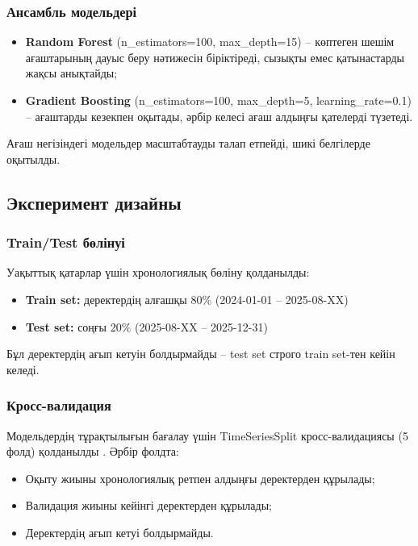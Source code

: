 \documentclass[12pt,a4paper]{article}
\begin{document}
\subsubsection{Ансамбль модельдері}

\begin{itemize}
\item \textbf{Random Forest} (n\_estimators=100, max\_depth=15) – көптеген шешім ағаштарының дауыс беру нәтижесін біріктіреді, сызықты емес қатынастарды жақсы анықтайды;
\item \textbf{Gradient Boosting} (n\_estimators=100, max\_depth=5, learning\_rate=0.1) – ағаштарды кезекпен оқытады, әрбір келесі ағаш алдыңғы қателерді түзетеді.
\end{itemize}

Ағаш негізіндегі модельдер масштабтауды талап етпейді, шикі белгілерде оқытылды.

\subsection{Эксперимент дизайны}

\subsubsection{Train/Test бөлінуі}

Уақыттық қатарлар үшін хронологиялық бөліну қолданылды:
\begin{itemize}
\item \textbf{Train set:} деректердің алғашқы 80\% (2024-01-01 – 2025-08-XX)
\item \textbf{Test set:} соңғы 20\% (2025-08-XX – 2025-12-31)
\end{itemize}

Бұл деректердің ағып кетуін болдырмайды – test set строго train set-тен кейін келеді.

\subsubsection{Кросс-валидация}

Модельдердің тұрақтылығын бағалау үшін TimeSeriesSplit кросс-валидациясы (5 фолд) қолданылды \cite{bergmeir2012}. Әрбір фолдта:
\begin{itemize}
\item Оқыту жиыны хронологиялық ретпен алдыңғы деректерден құрылады;
\item Валидация жиыны кейінгі деректерден құрылады;
\item Деректердің ағып кетуі болдырмайды.
\end{itemize}
\end{document}
